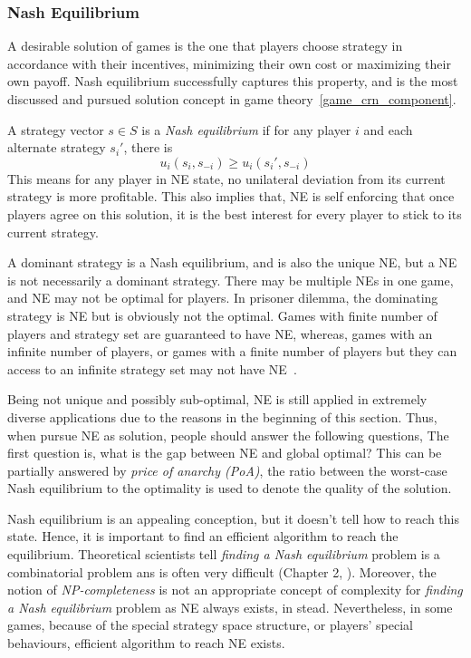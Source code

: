 \subsubsection*{Nash Equilibrium}
A desirable solution of games is the one that players choose strategy in accordance with their incentives, minimizing their own cost or maximizing their own payoff.
Nash equilibrium successfully captures this property, and is the most discussed and pursued solution concept in game theory~\ref{game_crn_component}.

A strategy vector $s\in S$ is a \textit{Nash equilibrium} if for any player $i$ and each alternate strategy $s_i'$, there is
 \[ u_i(s_i, s_{-i}) \geq u_i(s_i', s_{-i})\]
This means for any player in NE state, no unilateral deviation from its current strategy is more profitable.
This also implies that, NE is self enforcing that once players agree on this solution, it is the best interest for every player to stick to its current strategy.

A dominant strategy is a Nash equilibrium, and is also the unique NE, but a NE is not necessarily a dominant strategy.
There may be multiple NEs in one game, and NE may not be optimal for players. 
In prisoner dilemma, the dominating strategy is NE but is obviously not the optimal.
Games with finite number of players and strategy set are guaranteed to have NE, whereas, games with an infinite number of players, or games with a finite number of players but they can access to an infinite strategy set may not have NE~\cite{agt_book}.


Being not unique and possibly sub-optimal, NE is still applied in extremely diverse applications due to the reasons in the beginning of this section.
Thus, when pursue NE as solution, people should answer the following questions,
The first question is, what is the gap between NE and global optimal?
This can be partially answered by \textit{price of anarchy (PoA)}, the ratio between the worst-case Nash equilibrium to the optimality is used to denote the quality of the solution.

Nash equilibrium is an appealing conception, but it doesn't tell how to reach this state.
Hence, it is important to find an efficient algorithm to reach the equilibrium.
Theoretical scientists tell \textit{finding a Nash equilibrium} problem is a combinatorial problem ans is often very difficult (Chapter 2, \cite{agt_book}).
Moreover, the notion of \textit{NP-completeness} is not an appropriate concept of complexity for \textit{finding a Nash equilibrium} problem as NE always exists, in stead.
Nevertheless, in some games, because of the special strategy space structure, or players' special behaviours, efficient algorithm to reach NE exists.





